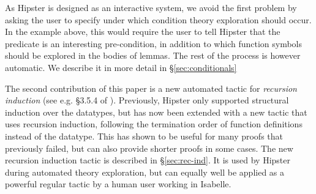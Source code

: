 As Hipster is designed as an interactive system, we avoid the first problem by asking the user to specify under which condition theory exploration should occur.
%
In the example above, this would require the user to tell Hipster that the predicate  is an interesting pre-condition, in addition to which function symbols should be explored in the bodies of lemmas.
%
The rest of the process is however automatic.
%
We describe it in more detail in \S \ref{sec:conditionals} 

The second contribution of this paper is a new automated tactic for \emph{recursion induction} (see e.g. \S3.5.4 of \cite{isabelle}).
%
Previously, Hipster only supported structural induction over the datatypes, but has now been extended with a new tactic that uses recursion induction, following the termination order of function definitions instead of the datatype.
%
This has shown to be useful for many proofs that previously failed, but can also provide shorter proofs in some cases.
%
The new recursion induction tactic is described in \S \ref{sec:rec-ind}.
%
It is used by Hipster during automated theory exploration, but can equally well be applied as a powerful regular tactic by a human user working in Isabelle.
